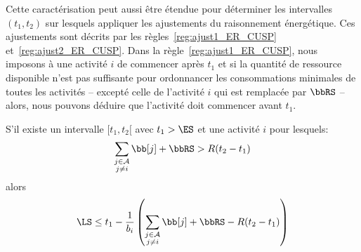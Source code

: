 Cette caractérisation peut aussi être étendue pour déterminer les
intervalles $(t_1,t_2)$ sur lesquels appliquer les ajustements du
raisonnement énergétique. Ces ajustements sont décrits par les 
règles~\ref{reg:ajust1_ER_CUSP} et~\ref{reg:ajust2_ER_CUSP}.  Dans la
règle~\ref{reg:ajust1_ER_CUSP}, nous imposons à une activité $i$ de
commencer après $t_1$ et si la quantité de ressource
disponible n'est pas suffisante pour ordonnancer les consommations
minimales de toutes les activités -- excepté celle de l'activité $i$
qui est remplacée par $\bbRS$ -- alors, nous pouvons déduire que
l'activité doit commencer avant $t_1$.

\begin{reg}
  \label{reg:ajust1_ER_CUSP}
  S'il existe un intervalle $[t_1,t_2[$ avec $t_1 > \ES$ et une activité $i$ pour lesquels:
  \[ \sum_{\substack{j \in \A \\ j \neq i}} \bb[j] + \bbRS > R (t_2-t_1)\]
  alors 
  \[  \LS \le t_1 - \frac{1}{b_i} \left( \sum_{\substack{j \in \A \\ j
          \neq i}} \bb[j] + \bbRS - R (t_2-t_1) \right) \]
\end{reg}

